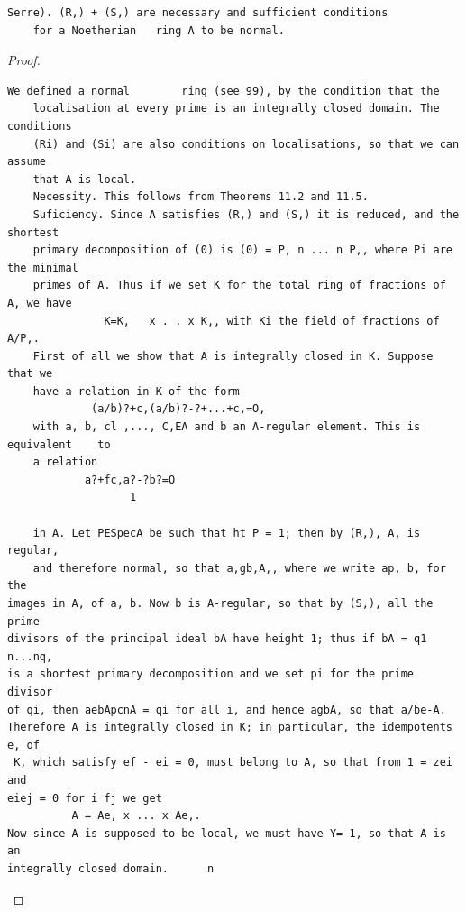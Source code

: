 \begin{theorem}\label{mcrt-auto-theorem-23-8}\uses{}
\begin{verbatim}
Serre). (R,) + (S,) are necessary and sufficient conditions
    for a Noetherian   ring A to be normal.
\end{verbatim}
\end{theorem}
\begin{proof}
\begin{verbatim}
We defined a normal        ring (see 99), by the condition that the
    localisation at every prime is an integrally closed domain. The conditions
    (Ri) and (Si) are also conditions on localisations, so that we can assume
    that A is local.
    Necessity. This follows from Theorems 11.2 and 11.5.
    Suficiency. Since A satisfies (R,) and (S,) it is reduced, and the shortest
    primary decomposition of (0) is (0) = P, n ... n P,, where Pi are the minimal
    primes of A. Thus if we set K for the total ring of fractions of A, we have
               K=K,   x . . x K,, with Ki the field of fractions of A/P,.
    First of all we show that A is integrally closed in K. Suppose that we
    have a relation in K of the form
             (a/b)?+c,(a/b)?-?+...+c,=O,
    with a, b, cl ,..., C,EA and b an A-regular element. This is equivalent    to
    a relation
            a?+fc,a?-?b?=O
                   1

    in A. Let PESpecA be such that ht P = 1; then by (R,), A, is regular,
    and therefore normal, so that a,gb,A,, where we write ap, b, for the
images in A, of a, b. Now b is A-regular, so that by (S,), all the prime
divisors of the principal ideal bA have height 1; thus if bA = q1 n...nq,
is a shortest primary decomposition and we set pi for the prime divisor
of qi, then aebApcnA = qi for all i, and hence agbA, so that a/be-A.
Therefore A is integrally closed in K; in particular, the idempotents e, of
 K, which satisfy ef - ei = 0, must belong to A, so that from 1 = zei and
eiej = 0 for i fj we get
          A = Ae, x ... x Ae,.
Now since A is supposed to be local, we must have Y= 1, so that A is an
integrally closed domain.      n
\end{verbatim}
\end{proof}


